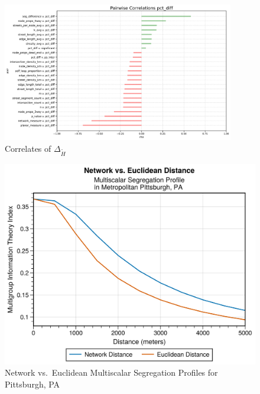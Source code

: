\begin{figure}
\hypertarget{fig:correlations}{%
\centering
\includegraphics[width=0.9\textwidth,height=\textheight]{./figures/correlations.png}
\caption{Correlates of \(\Delta_{\tilde{H}}\)}\label{fig:correlations}
}
\end{figure}

\begin{figure}
\hypertarget{fig:multiscalar}{%
\centering
\includegraphics{./figures/pitt_example.png}
\caption{Network vs.~Euclidean Multiscalar Segregation Profiles for
Pittsburgh, PA}\label{fig:multiscalar}
}
\end{figure}
